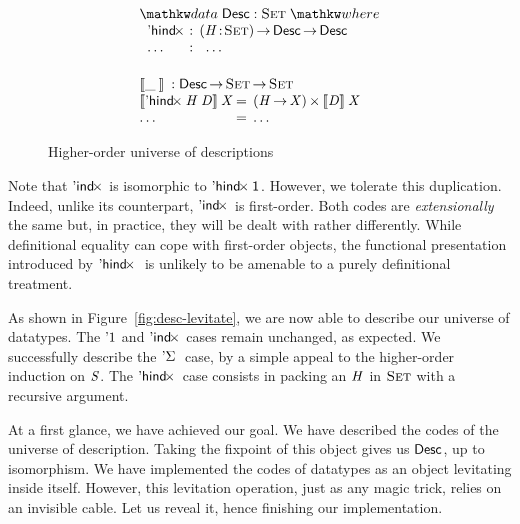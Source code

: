 \begin{figure}

\[\stk{
\begin{array}{ll}
\stk{
\data \Desc : \Set \where \\
\;\;\begin{array}{@{}l@{\::\:\:}l@{\quad}l}
    \DHindx{\!}{\!} & \PI{\V{H}}{\Set} \Desc \To \Desc \\
    \ldots          & \:\:\ldots
\end{array}
}
\vspace{0.2in}
\\
\stk{
\descop{\_\:}{} : \Desc \To \Set \To \Set \\
\begin{array}{@{}l@{\:=\:\:}ll}
\descop{\DHindx{\V{H}}{\V{D}}}{\V{X}}     &  \TIMES{(\V{H} \To \V{X})}{\descop{\V{D}}{\V{X}}} \\
\ldots                                    &  \ldots 
\end{array}
}
\end{array}
}\]

\caption{Higher-order universe of descriptions}
\label{fig:hindx_desc}

\end{figure}


Note that $\DIndx{\!}$ is isomorphic to $\DHindx{\Unit}{\!}$. However,
we tolerate this duplication. Indeed, unlike its counterpart,
$\DIndx{\!}$ is first-order. Both codes are \emph{extensionally} the
same but, in practice, they will be dealt with rather
differently. While definitional equality can cope with first-order
objects, the functional presentation introduced by $\DHindx{\!}{}$ is
unlikely to be amenable to a purely definitional treatment.

As shown in Figure~\ref{fig:desc-levitate}, we are now able to
describe our universe of datatypes.  The $\DUnit$ and $\DIndx{\!}$
cases remain unchanged, as expected. We successfully describe the
$\DSigma{\!}{}$ case, by a simple appeal to the higher-order induction
on $\V{S}$. The $\DHindx{\!}{\!}$ case consists in packing an $\V{H}$
in $\Set$ with a recursive argument.

At a first glance, we have achieved our goal. We have described the
codes of the universe of description. Taking the fixpoint of this
object gives us $\Desc$, up to isomorphism. We have implemented the
codes of datatypes as an object levitating inside itself. However,
this levitation operation, just as any magic trick, relies on an
invisible cable. Let us reveal it, hence finishing our implementation.


